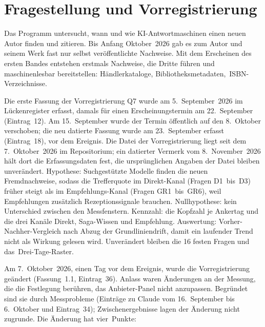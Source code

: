 \documentclass[11pt]{article}
\begin{document}
\clearpage
{}\section{Fragestellung und Vorregistrierung}

Das Programm untersucht, wann und wie KI-Antwortmaschinen einen neuen Autor finden und zitieren. Bis Anfang Oktober~2026 gab es zum Autor und seinem Werk fast nur selbst veröffentlichte Nachweise. Mit dem Erscheinen des ersten Bandes entstehen erstmals Nachweise, die Dritte führen und maschinenlesbar bereitstellen: Händlerkataloge, Bibliotheksmetadaten,~\mbox{ISBN-Verzeichnisse.}

Die erste Fassung der Vorregistrierung Q7 wurde am 5.~September~2026 im Lückenregister erfasst, damals für einen Erscheinungstermin am 22.~September (Eintrag~12). Am 15.~September wurde der Termin öffentlich auf den 8.~Oktober verschoben; die neu datierte Fassung wurde am 23.~September erfasst (Eintrag~18), vor dem Ereignis. Die Datei der Vorregistrierung liegt seit dem 7.~Oktober~2026 im Repositorium; ein datierter Vermerk vom 8.~November~2026 hält dort die Erfassungsdaten fest, die ursprünglichen Angaben der Datei bleiben unverändert. Hypothese: Suchgestützte Modelle finden die neuen Fremdnachweise, sodass die Trefferquote im Direkt-Kanal (Fragen D1~bis~D3) früher steigt als im Empfehlungs-Kanal (Fragen GR1~bis~GR6), weil Empfehlungen zusätzlich Rezeptionssignale brauchen. Nullhypothese: kein Unterschied zwischen den Messfenstern. Kennzahl: die Kopfzahl je Ankertag und die drei Kanäle Direkt, Saga-Wissen und Empfehlung. Auswertung: Vorher-Nachher-Vergleich nach Abzug der Grundliniendrift, damit ein laufender Trend nicht als Wirkung gelesen wird. Unverändert bleiben die 16 festen Fragen und das~\mbox{Drei-Tage-Raster.}

Am 7.~Oktober~2026, einen Tag vor dem Ereignis, wurde die Vorregistrierung geändert (Fassung~1.1, Eintrag~36). Anlass waren Änderungen an der Messung, die die Festlegung berühren, das Anbieter-Panel nicht anzupassen. Begründet sind sie durch Messprobleme (Einträge zu Claude vom 16.~September bis 6.~Oktober und Eintrag~34); Zwischenergebnisse lagen der Änderung nicht zugrunde. Die Änderung hat vier~\mbox{Punkte:}
\end{document}
